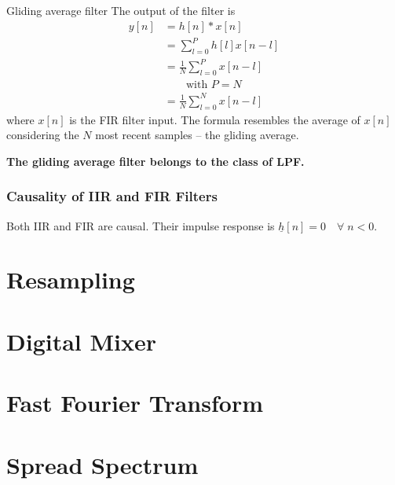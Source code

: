 \begin{refsection}
\begin{example}{Gliding average filter}
	The output of the filter is
	\begin{equation}
		\begin{split}
			y[n] &= h[n] * x[n] \\
			 &= \sum\limits_{l=0}^{P} h[l] x[n - l] \\
			 &= \frac{1}{N} \sum\limits_{l=0}^{P} x[n - l] \\
			 &\qquad \text{with } P = N \\
			 &= \frac{1}{N} \sum\limits_{l=0}^{N} x[n - l]
		\end{split}
	\end{equation}
	where $x[n]$ is the \ac{FIR} filter input. The formula resembles the average of $x[n]$ considering the $N$ most recent samples -- the gliding average.
	
	\vspace{0.5em}
	
	\textbf{The gliding average filter belongs to the class of \ac{LPF}.}
\end{example}

\subsubsection{Causality of IIR and FIR Filters}

Both \ac{IIR} and \ac{FIR} are causal. Their impulse response is $\underline{h}[n] = 0 \quad \forall \; n < 0$.

\section{Resampling}





\section{Digital Mixer}

\section{Fast Fourier Transform}



\section{Spread Spectrum}


\end{refsection}
